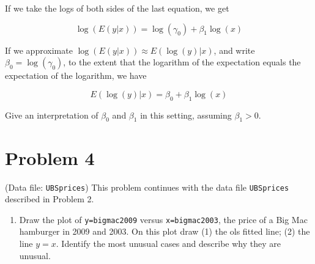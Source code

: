 \documentclass[
]{article}
\newenvironment{Shaded}{\begin{snugshade}}{\end{snugshade}}
\newcommand{\AttributeTok}[1]{\textcolor[rgb]{0.77,0.63,0.00}{#1}}
\newcommand{\DecValTok}[1]{\textcolor[rgb]{0.00,0.00,0.81}{#1}}
\newcommand{\FloatTok}[1]{\textcolor[rgb]{0.00,0.00,0.81}{#1}}
\newcommand{\FunctionTok}[1]{\textcolor[rgb]{0.00,0.00,0.00}{#1}}
\newcommand{\NormalTok}[1]{#1}
\newcommand{\SpecialCharTok}[1]{\textcolor[rgb]{0.00,0.00,0.00}{#1}}
\newcommand{\StringTok}[1]{\textcolor[rgb]{0.31,0.60,0.02}{#1}}
\providecommand{\tightlist}{%
  \setlength{\itemsep}{0pt}\setlength{\parskip}{0pt}}
\begin{document}
If we take the logs of both sides of the last equation, we get

\[
\log(E(y|x)) = \log(\gamma_0) + \beta_1 \log(x)
\]

If we approximate \(\log(E(y|x)) \approx E(\log(y)|x)\), and write
\(\beta_0 = \log(\gamma_0)\), to the extent that the logarithm of the
expectation equals the expectation of the logarithm, we have

\[
E(\log(y)|x) = \beta_0 + \beta_1 \log(x)
\]

Give an interpretation of \(\beta_0\) and \(\beta_1\) in this setting,
assuming \(\beta_1>0\).

\hypertarget{problem-4}{%
\section{Problem 4}\label{problem-4}}

(Data file: \texttt{UBSprices}) This problem continues with the data
file \texttt{UBSprices} described in Problem 2.

\begin{enumerate}
\def\labelenumi{\alph{enumi}.}
\tightlist
\item
  Draw the plot of \texttt{y=bigmac2009} versus \texttt{x=bigmac2003},
  the price of a Big Mac hamburger in 2009 and 2003. On this plot draw
  (1) the ols fitted line; (2) the line \(y = x\). Identify the most
  unusual cases and describe why they are unusual.
\end{enumerate}

\begin{Shaded}
\end{Shaded}
\end{document}
